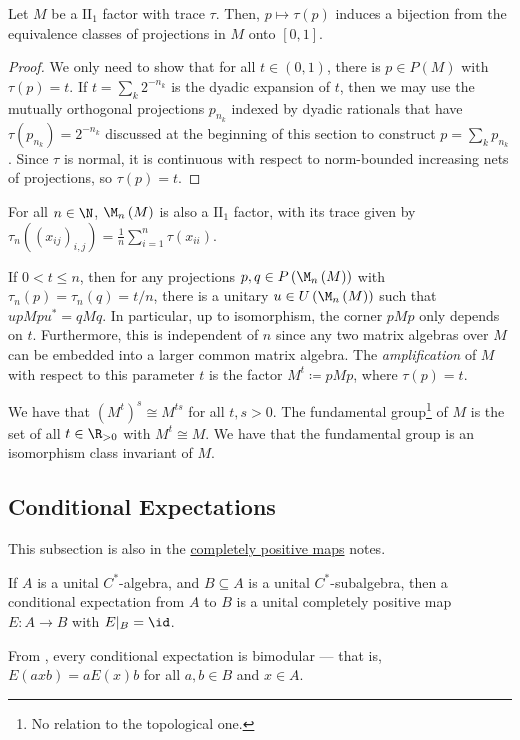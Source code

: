 \documentclass[10pt]{mypackage}
\renewcommand{\coloneq}{\coloneqq}
\begin{document}
\begin{proposition}
  Let $M$ be a $\text{II}_1$ factor with trace $\tau$. Then, $p\mapsto \tau(p)$ induces a bijection from the equivalence classes of projections in $M$ onto $[0,1]$.
\end{proposition}
\begin{proof}
  We only need to show that for all $t\in \left( 0,1 \right)$, there is $p\in P(M)$ with $\tau(p) = t$. If $t = \sum_{k}2^{-n_k}$ is the dyadic expansion of $t$, then we may use the mutually orthogonal projections $p_{n_k}$ indexed by dyadic rationals that have $\tau\left( p_{n_k} \right) = 2^{-n_k}$ discussed at the beginning of this section to construct $p = \sum_{k}p_{n_k}$. Since $\tau$ is normal, it is continuous with respect to norm-bounded increasing nets of projections, so $\tau(p) = t$.
\end{proof}
For all $n\in \N$, $\M_n\left( M \right)$ is also a $\text{II}_1$ factor, with its trace given by $\tau_n\left( \left( x_{ij} \right)_{i,j} \right) = \frac{1}{n}\sum_{i=1}^{n}\tau\left( x_{ii} \right)$.

If $0 < t \leq n$, then for any projections $p,q\in P\left( \M_n\left( M \right) \right)$ with $\tau_n\left( p \right) = \tau_n\left( q \right) = t/n$, there is a unitary $u\in U\left( \M_n\left( M \right) \right)$ such that $upMpu^{\ast} = qMq$. In particular, up to isomorphism, the corner $pMp$ only depends on $t$. Furthermore, this is independent of $n$ since any two matrix algebras over $M$ can be embedded into a larger common matrix algebra. The \textit{amplification} of $M$ with respect to this parameter $t$ is the factor $M^{t}\coloneq pMp$, where $\tau(p) = t$.

We have that $\left( M^t \right)^{s} \cong M^{ts}$ for all $t,s > 0$. The fundamental group\footnote{No relation to the topological one.} of $M$ is the set of all $t\in \R_{ > 0 }$ with $M^{t}\cong M$. We have that the fundamental group is an isomorphism class invariant of $M$.
\subsection{Conditional Expectations}%
This subsection is also in the \href{https://ai-bearing.github.io/Classes_and_Homework/After\%20College/Other\%20Notes/completely_positive_maps.pdf}{completely positive maps} notes.
\begin{definition}
  If $A$ is a unital $C^{\ast}$-algebra, and $B\subseteq A$ is a unital $C^{\ast}$-subalgebra, then a conditional expectation from $A$ to $B$ is a unital completely positive map $E\colon A\rightarrow B$ with $E|_{B} = \id$. 
\end{definition}
From \cite[Corollary 3.19]{paulsen_completely_bounded_maps}, every conditional expectation is bimodular --- that is, $E\left( axb \right) = aE(x)b$ for all $a,b\in B$ and $x\in A$.
\end{document}
